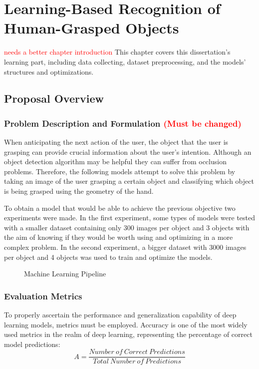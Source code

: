 \chapter{Learning-Based Recognition of Human-Grasped Objects}
\label{chapter:learning}

\textcolor{red}{needs a better chapter introduction} This chapter covers this dissertation's learning part, including data collecting, dataset preprocessing, and the models' structures and optimizations.

\section{Proposal Overview}

\subsection{Problem Description and Formulation \textcolor{red}{(Must be changed)}}

When anticipating the next action of the user, the object that the user is grasping can provide crucial information about the user's intention. Although an object detection algorithm may be helpful they can suffer from occlusion problems. Therefore, the following models attempt to solve this problem by taking an image of the user grasping a certain object and classifying which object is being grasped using the geometry of the hand.

To obtain a model that would be able to achieve the previous objective two experiments were made. In the first experiment, some types of models were tested with a smaller dataset containing only 300 images per object and 3 objects with the aim of knowing if they would be worth using and optimizing in a more complex problem. In the second experiment, a bigger dataset with 3000 images per object and 4 objects was used to train and optimize the models.

\begin{figure}[H]%
    \centering
    
    \caption{Machine Learning Pipeline}
    \label{fig:ml_pipeline}
\end{figure}

\subsection{Evaluation Metrics}

To properly ascertain the performance and generalization capability of deep learning models, metrics must be employed. Accuracy is one of the most widely used metrics in the realm of deep learning, representing the percentage of correct model predictions: \begin{equation}A=\frac{Number\ of\ Correct\ Predictions}{Total\ Number\ of\ Predictions}\label{eq:acc}\end{equation}

